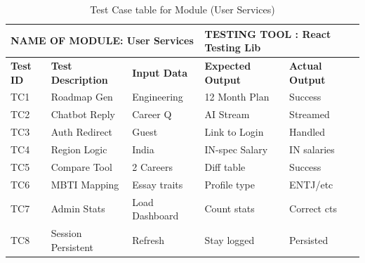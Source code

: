 \begin{table}[htbp]
\begin{center}
\caption{Test Case table for Module (User Services)}
 \begin{tabular}{| m{1cm} | m{4cm} | m{2 cm}| m{3cm}|m{3cm}| } 
\hline
\multicolumn{3}{|l|}{NAME OF MODULE: User Services}&
\multicolumn{2}{|l|}{TESTING TOOL : React Testing Lib}\\[0.8cm]
\hline
\textbf{Test ID} &\textbf{Test Description} & \textbf{Input Data} & \textbf{Expected Output} & \textbf{Actual Output} \\ 
\hline
TC1 & Roadmap Gen & Engineering & 12 Month Plan & Success \\[1.25cm]
\hline
TC2 & Chatbot Reply & Career Q & AI Stream & Streamed \\[1.25cm]
\hline
TC3 & Auth Redirect & Guest & Link to Login & Handled \\[1.25cm]
\hline
TC4 & Region Logic & India & IN-spec Salary & IN salaries \\[1.25cm]
\hline
TC5 & Compare Tool & 2 Careers & Diff table & Success \\[1.25cm]
\hline
TC6 & MBTI Mapping & Essay traits & Profile type & ENTJ/etc \\[1.25cm]
\hline
TC7 & Admin Stats & Load Dashboard & Count stats & Correct cts \\[1.25cm]
\hline
TC8 & Session Persistent & Refresh & Stay logged & Persisted \\[1.25cm]
\hline
\end{tabular}

\end{center}
\end{table}
